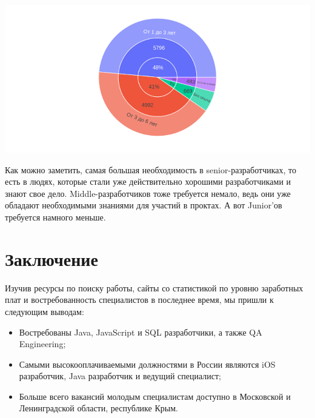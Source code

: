 \documentclass{article}
\begin{document}
\includegraphics[width=\textwidth]{Images/6.2.png}

Как можно заметить, самая большая необходимость в senior-разработчиках, то есть в людях, которые стали уже действительно хорошими разработчиками и знают свое дело. Middle-разработчиков тоже требуется немало, ведь они уже обладают необходимыми знаниями для участий в проктах. А вот Junior’ов требуется намного меньше.

\newpage
\section{Заключение}

Изучив ресурсы по поиску работы, сайты со статистикой по уровню заработных плат и востребованность специалистов в последнее время, мы пришли к следующим выводам:
\begin{itemize}
  \item Востребованы Java, JavaScript и SQL разработчики, а также QA Engineering;
  \item Самыми высокооплачиваемыми должностями в России являются iOS разработчик, Java разработчик и ведущий специалист;
  \item Больше всего вакансий молодым специалистам доступно в Московской и Ленинградской области, республике Крым.
\end{itemize}
\end{document}
